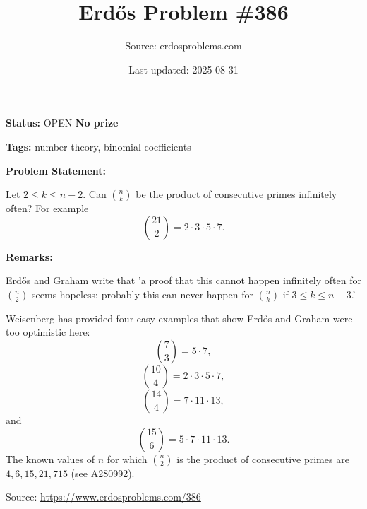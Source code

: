 \documentclass{article}
\title{Erd\H{o}s Problem \#386}
\date{Last updated: 2025-08-31}
\author{Source: erdosproblems.com}
\begin{document}
\maketitle

\noindent\textbf{Status:} OPEN \quad \textbf{No prize}

\noindent\textbf{Tags:} number theory, binomial coefficients

\medskip
\noindent\textbf{Problem Statement:}

Let $2\leq k\leq n-2$. Can $\binom{n}{k}$ be the product of consecutive primes infinitely often? For example\[\binom{21}{2}=2\cdot 3\cdot 5\cdot 7.\]

\bigskip
\noindent\textbf{Remarks:}

Erd\H{o}s and Graham write that 'a proof that this cannot happen infinitely often for $\binom{n}{2}$ seems hopeless; probably this can never happen for $\binom{n}{k}$ if $3\leq k\leq n-3$.'

Weisenberg has provided four easy examples that show Erd\H{o}s and Graham were too optimistic here:\[\binom{7}{3}=5\cdot 7,\]\[\binom{10}{4}= 2\cdot 3\cdot 5\cdot 7,\]\[\binom{14}{4} = 7\cdot 11\cdot 13,\]and\[\binom{15}{6}=5\cdot 7\cdot 11\cdot 13.\]The known values of $n$ for which $\binom{n}{2}$ is the product of consecutive primes are $4,6,15,21,715$ (see A280992).

\bigskip
\noindent\small{Source: \url{https://www.erdosproblems.com/386}}
\end{document}
